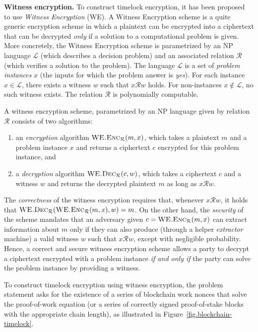 \noindent
\textbf{Witness encryption.}
To construct timelock encryption, it has been proposed~\cite{timelock-bitcoin} to
use \emph{Witness Encryption} (WE). A Witness Encryption scheme is a quite generic
encryption scheme in which a plaintext can be encrypted into a ciphertext that
can be decrypted \emph{only} if a solution to a computational problem is given.
More concretely, the Witness Encryption scheme is parametrized by
an \textsc{NP} language $\mathcal{L}$ (which describes a decision problem)
and an associated relation $\mathcal{R}$ (which verifies a solution to the problem).
The language $\mathcal{L}$ is a set of \emph{problem instances} $x$ (the inputs
for which the problem answer is \emph{yes}). For each instance
$x \in \mathcal{L}$, there exists a witness $w$ such that $x\mathcal{R}w$ holds. For
non-instances $x \not\in \mathcal{L}$, no such witness exists. The relation $\mathcal{R}$
is polynomially computable.

A witness encryption scheme, parametrized by an \textsc{NP} language given by relation $\mathcal{R}$
consists of two algorithms:

\begin{enumerate}
  \item an \emph{encryption} algorithm $\textsc{WE.Enc}_\mathcal{R}(m, x)$, which takes a plaintext
        $m$ and a problem instance $x$ and returns a ciphertext $c$ encrypted for this problem instance,
        and
  \item a \emph{decryption} algorithm $\textsc{WE.Dec}_\mathcal{R}(c, w)$, which takes a ciphertext
        $c$ and a witness $w$ and returns the decrypted plaintext $m$ as long as $x \mathcal{R} w$.
\end{enumerate}

The \emph{correctness} of the witness encryption requires that, whenever $x \mathcal{R} w$, it holds
that $\textsc{WE.Dec}_\mathcal{R}(\textsc{WE.Enc}_\mathcal{R}(m, x), w) = m$. On the other hand, the \emph{security}
of the scheme mandates that an adversary
given $c = \textsc{WE.Enc}_\mathcal{R}(m, x)$
can extract information about $m$
only if they can also produce
(through a helper \emph{extractor} machine)
a valid witness $w$ such that $x \mathcal{R} w$, except with negligible probability.
Hence, a correct and secure witness encryption scheme allows a party to decrypt a ciphertext encrypted
with a problem instance \emph{if and only if} the party can solve the problem instance by providing a
witness.

To construct timelock encryption using witness encryption, the problem statement asks for the
existence of a series of blockchain work nonces that solve the proof-of-work equation (or a series
of correctly signed proof-of-stake blocks with the appropriate chain length), as illustrated
in Figure~\ref{fig.blockchain-timelock}.

